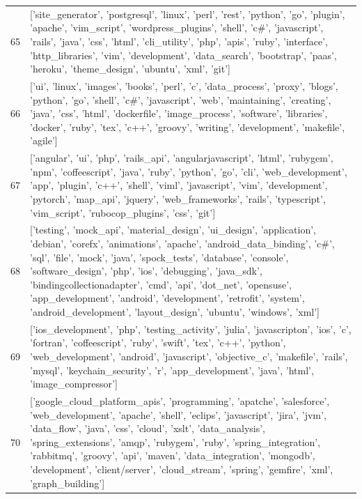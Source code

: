 \begin{center}
\begin{longtable}{|p{1.5cm}|p{12.5cm}|}
            65 & ['site\_generator', 'postgresql', 'linux', 'perl', 'rest', 'python', 'go', 'plugin', 'apache', 'vim\_script', 'wordpress\_plugins', 'shell', 'c\#', 'javascript', 'rails', 'java', 'css', 'html', 'cli\_utility', 'php', 'apis', 'ruby', 'interface', 'http\_libraries', 'vim', 'development', 'data\_search', 'bootstrap', 'paas', 'heroku', 'theme\_design', 'ubuntu', 'xml', 'git']  \\ 
            66 & ['ui', 'linux', 'images', 'books', 'perl', 'c', 'data\_process', 'proxy', 'blogs', 'python', 'go', 'shell', 'c\#', 'javascript', 'web', 'maintaining', 'creating', 'java', 'css', 'html', 'dockerfile', 'image\_process', 'software', 'libraries', 'docker', 'ruby', 'tex', 'c++', 'groovy', 'writing', 'development', 'makefile', 'agile']  \\ 
            67 & ['angular', 'ui', 'php', 'rails\_api', 'angularjavascript', 'html', 'rubygem', 'npm', 'coffeescript', 'java', 'ruby', 'python', 'go', 'cli', 'web\_development', 'app', 'plugin', 'c++', 'shell', 'viml', 'javascript', 'vim', 'development', 'pytorch', 'map\_api', 'jquery', 'web\_frameworks', 'rails', 'typescript', 'vim\_script', 'rubocop\_plugins', 'css', 'git']  \\ 
            68 & ['testing', 'mock\_api', 'material\_design', 'ui\_design', 'application', 'debian', 'corefx', 'animations', 'apache', 'android\_data\_binding', 'c\#', 'sql', 'file', 'mock', 'java', 'spock\_tests', 'database', 'console', 'software\_design', 'php', 'ios', 'debugging', 'java\_sdk', 'bindingcollectionadapter', 'cmd', 'api', 'dot\_net', 'opensuse', 'app\_development', 'android', 'development', 'retrofit', 'system', 'android\_development', 'layout\_design', 'ubuntu', 'windows', 'xml']  \\ 
            69 & ['ios\_development', 'php', 'testing\_activity', 'julia', 'javascripton', 'ios', 'c', 'fortran', 'coffeescript', 'ruby', 'swift', 'tex', 'c++', 'python', 'web\_development', 'android', 'javascript', 'objective\_c', 'makefile', 'rails', 'mysql', 'keychain\_security', 'r', 'app\_development', 'java', 'html', 'image\_compressor']  \\ 
            70 & ['google\_cloud\_platform\_apis', 'programming', 'apatche', 'salesforce', 'web\_development', 'apache', 'shell', 'eclips', 'javascript', 'jira', 'jvm', 'data\_flow', 'java', 'css', 'cloud', 'xslt', 'data\_analysis', 'spring\_extensions', 'amqp', 'rubygem', 'ruby', 'spring\_integration', 'rabbitmq', 'groovy', 'api', 'maven', 'data\_integration', 'mongodb', 'development', 'client/server', 'cloud\_stream', 'spring', 'gemfire', 'xml', 'graph\_building']  \\ 

\end{longtable}
\end{center}
